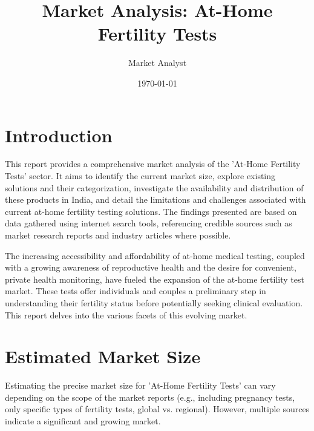 \documentclass{article}
\title{Market Analysis: At-Home Fertility Tests}
\author{Market Analyst}
\date{\today}
\begin{document}
\maketitle

\section{Introduction}
This report provides a comprehensive market analysis of the 'At-Home Fertility Tests' sector. It aims to identify the current market size, explore existing solutions and their categorization, investigate the availability and distribution of these products in India, and detail the limitations and challenges associated with current at-home fertility testing solutions. The findings presented are based on data gathered using internet search tools, referencing credible sources such as market research reports and industry articles where possible.

The increasing accessibility and affordability of at-home medical testing, coupled with a growing awareness of reproductive health and the desire for convenient, private health monitoring, have fueled the expansion of the at-home fertility test market. These tests offer individuals and couples a preliminary step in understanding their fertility status before potentially seeking clinical evaluation. This report delves into the various facets of this evolving market.

\section{Estimated Market Size}

Estimating the precise market size for 'At-Home Fertility Tests' can vary depending on the scope of the market reports (e.g., including pregnancy tests, only specific types of fertility tests, global vs. regional). However, multiple sources indicate a significant and growing market.
\end{document}

